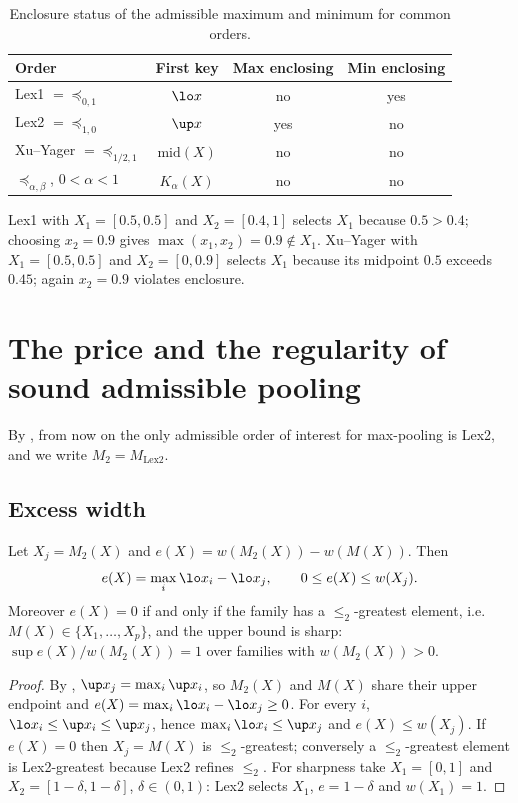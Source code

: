 \begin{table}[t]
\centering
\caption{Enclosure status of the admissible maximum and minimum for common orders.}
\label{tab:status}
\begin{tabular}{lccc}
\toprule
Order & First key & Max enclosing & Min enclosing \\
\midrule
Lex1 $=\preceq_{0,1}$ & $\lo x$ & no & yes \\
Lex2 $=\preceq_{1,0}$ & $\up x$ & yes & no \\
Xu--Yager $=\preceq_{1/2,1}$ & $\mathrm{mid}(X)$ & no & no \\
$\preceq_{\alpha,\beta}$, $0<\alpha<1$ & $K_\alpha(X)$ & no & no \\
\bottomrule
\end{tabular}
\end{table}

\begin{example}\label{ex:fail}
Lex1 with $X_1=[0.5,0.5]$ and $X_2=[0.4,1]$ selects $X_1$ because $0.5>0.4$; choosing $x_2=0.9$ gives $\max(x_1,x_2)=0.9\notin X_1$. Xu--Yager with $X_1=[0.5,0.5]$ and $X_2=[0,0.9]$ selects $X_1$ because its midpoint $0.5$ exceeds $0.45$; again $x_2=0.9$ violates enclosure.
\end{example}

\section{The price and the regularity of sound admissible pooling}
\label{sec:price}

By , from now on the only admissible order of interest for max-pooling is Lex2, and we write $M_2=M_{\mathrm{Lex2}}$.

\subsection{Excess width}

\begin{proposition}\label{prop:excess}
Let $X_j=M_2(X)$ and $e(X)=w(M_2(X))-w(M(X))$. Then
\[
e(X)=\max_i\lo x_i-\lo x_j,\qquad 0\le e(X)\le w(X_j).
\]
Moreover $e(X)=0$ if and only if the family has a $\le_2$-greatest element, i.e.\ $M(X)\in\{X_1,\dots,X_p\}$, and the upper bound is sharp: $\sup e(X)/w(M_2(X))=1$ over families with $w(M_2(X))>0$.
\end{proposition}

\begin{proof}
By , $\up x_j=\max_i\up x_i$, so $M_2(X)$ and $M(X)$ share their upper endpoint and $e(X)=\max_i\lo x_i-\lo x_j\ge0$. For every $i$, $\lo x_i\le\up x_i\le\up x_j$, hence $\max_i\lo x_i\le\up x_j$ and $e(X)\le w(X_j)$. If $e(X)=0$ then $X_j=M(X)$ is $\le_2$-greatest; conversely a $\le_2$-greatest element is Lex2-greatest because Lex2 refines $\le_2$. For sharpness take $X_1=[0,1]$ and $X_2=[1-\delta,1-\delta]$, $\delta\in(0,1)$: Lex2 selects $X_1$, $e=1-\delta$ and $w(X_1)=1$.
\end{proof}

